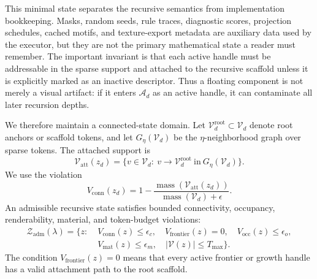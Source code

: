 \documentclass[sigconf,anonymous,review]{acmart}
\begin{document}
This minimal state separates the recursive semantics from implementation bookkeeping. Masks, random seeds, rule traces, diagnostic scores, projection schedules, cached motifs, and texture-export metadata are auxiliary data used by the executor, but they are not the primary mathematical state a reader must remember. The important invariant is that each active handle must be addressable in the sparse support and attached to the recursive scaffold unless it is explicitly marked as an inactive descriptor. Thus a floating component is not merely a visual artifact: if it enters $\mathcal A_d$ as an active handle, it can contaminate all later recursion depths.

We therefore maintain a connected-state domain. Let $\mathcal V_d^{\mathrm{root}}\subset \mathcal V_d$ denote root anchors or scaffold tokens, and let $G_\eta(\mathcal V_d)$ be the $\eta$-neighborhood graph over sparse tokens. The attached support is
\begin{equation}
\mathcal V_{\mathrm{att}}(z_d)=
\{v\in\mathcal V_d:\ v\to \mathcal V_d^{\mathrm{root}}\ \mathrm{in}\ G_\eta(\mathcal V_d)\}.
\end{equation}
We use the violation
\begin{equation}
V_{\mathrm{conn}}(z_d)=
1-\frac{\operatorname{mass}(\mathcal V_{\mathrm{att}}(z_d))}
{\operatorname{mass}(\mathcal V_d)+\epsilon}.
\end{equation}
An admissible recursive state satisfies bounded connectivity, occupancy, renderability, material, and token-budget violations:
\begin{align}
\mathcal Z_{\mathrm{adm}}(\lambda)=
\{z:\;& V_{\mathrm{conn}}(z)\le\epsilon_c,\quad
V_{\mathrm{frontier}}(z)=0,\quad
V_{\mathrm{occ}}(z)\le\epsilon_o,\nonumber\\
& V_{\mathrm{mat}}(z)\le\epsilon_m,\quad
|\mathcal V(z)|\le T_{\max}\}.
\end{align}
The condition $V_{\mathrm{frontier}}(z)=0$ means that every active frontier or growth handle has a valid attachment path to the root scaffold.
\end{document}
